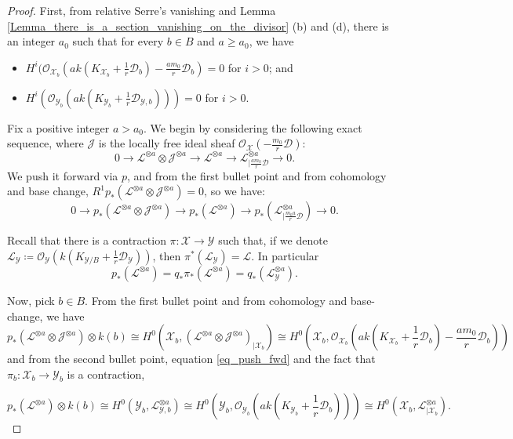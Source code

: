 \documentclass{amsart}
\newcommand{\cJ}{\mathcal{J}}
\newcommand{\cD}{\mathcal{D}}
\newcommand{\cL}{\mathcal{L}}
\newcommand{\cO}{\mathcal{O}}
\newcommand{\cX}{\mathcal{X}}
\newcommand{\cY}{\mathcal{Y}}
\theoremstyle{definition}
\begin{document}
\begin{proof}
First, from relative Serre's vanishing and Lemma \ref{Lemma_there_is_a_section_vanishing_on_the_divisor} (b) and (d), there is an integer $a_0$ such that for every $b\in B$ and $a \geq a_0$, we have
    \begin{itemize}
        \item $H^i(\cO_{\cX_b}(ak(K_{\cX_b} + \frac{1}{r}\cD_b) - \frac{am_0}{r}\cD_b)=0$ for $i>0$; and
        \item $H^i(\cO_{\cY_b}(ak(K_{\cY_b} + \frac{1}{r}\cD_{\cY,b})))=0$ for $i>0$.
    \end{itemize}



Fix a positive integer $a>a_0$.
We begin by considering the following exact sequence, where $\cJ$ is the locally free ideal sheaf $\cO_\cX\left(-\frac{m_0}{r}\cD\right) $:
$$0\to \cL^{\otimes a}\otimes \cJ^{\otimes a} \to \cL^{\otimes a} \to \cL_{|\frac{am_0}{r}\cD}^{\otimes a}\to 0.$$
We push it forward via $p$, and from the first bullet point and from cohomology and base change,
$R^1p_*(\cL^{\otimes a}\otimes \cJ^{\otimes a}) = 0$, so we have:
\begin{equation} \label{eq_ses}
    0\to p_*(\cL^{\otimes a}\otimes \cJ^{\otimes a} ) \to p_*( \cL^{\otimes a}) \to p_*(\cL_{|\frac{m_0a}{r}\cD}^{\otimes a})\to 0.
\end{equation}

Recall that there is a contraction $\pi \colon \cX\to \cY$ such that, if we denote $\cL_\cY \coloneqq \cO_{\cY}(k(K_{\cY/B} + \frac{1}{r}\cD_\cY))$, then  $\pi^*(\cL_\cY) = \cL$.
In particular
\begin{equation} \label{eq_push_fwd}
    p_*(\cL^{\otimes a}) = q_*\pi_* (\cL^{\otimes a}) = q_*(\cL_\cY^{\otimes a}).
\end{equation}

Now, pick $b\in B$. From the first bullet point and from cohomology and base-change, we have \begin{equation} \label{eq_13}
    p_*(\cL^{\otimes a}\otimes \cJ^{\otimes a} )\otimes k(b)\cong H^0(\cX_b, (\cL^{\otimes a}\otimes \cJ^{\otimes a})_{|\cX_b})  \cong H^0(\cX_b,\cO_{\cX_b}(ak(K_{\cX_b} + \frac{1}{r}\cD_b) - \frac{am_0}{r}\cD_b))
\end{equation}
and from the second bullet point, equation \eqref{eq_push_fwd} and the fact that $\pi_b\colon \cX_b\to \cY_b$ is a contraction,

\begin{equation} \label{eq_14}
    p_*(\cL^{\otimes a})\otimes k(b)\cong H^0(\cY_b, \cL^{\otimes a}_{\cY, b}) \cong  H^0(\cY_b,\cO_{\cY_b}(ak(K_{\cY_b} + \frac{1}{r}\cD_b)))  \cong H^0(\cX_b, \cL^{\otimes a}_{|\cX_b}).
\end{equation}



\end{proof}
\end{document}
